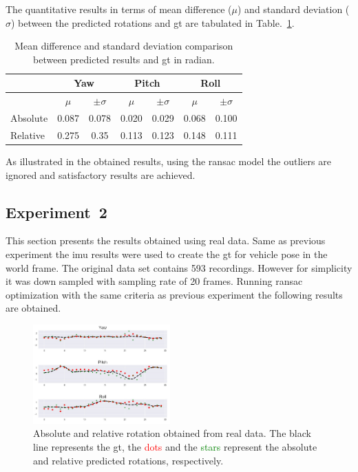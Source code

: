 The quantitative results in terms of mean difference ($\mu$) and standard
deviation ($\sigma$)
between the predicted rotations and \gls{gt} are tabulated in
Table.~\ref{tab:tab1}.

\begin{table}
  \caption{Mean difference and standard deviation comparison between predicted
    results and \gls{gt} in radian.}
  \begin{tabular}{l cc cc cc}
    \toprule
    & \multicolumn{2}{c}{Yaw} & \multicolumn{2}{c}{Pitch} &
                                                            \multicolumn{2}{c}{Roll}\\
    \midrule
    & $\mu$ & $\pm \sigma$ &  $\mu$ & $\pm \sigma$ &  $\mu$ & $\pm \sigma$\\
    \cmidrule{2-3} \cmidrule{4-5} \cmidrule{6-7}

    Absolute & 0.087 & 0.078 & 0.020 & 0.029 & 0.068 & 0.100 \\
    Relative & 0.275 & 0.35 & 0.113 & 0.123 & 0.148 & 0.111\\
    \bottomrule
  \end{tabular}
  \label{tab:tab1}
\end{table}

As illustrated in the obtained results, using the ransac
model the outliers are ignored and satisfactory results are achieved.

\subsection{Experiment~2}
\label{sec:exp2}
This section presents the results obtained using real data. Same as previous
experiment the \gls{imu} results were used to create the \gls{gt} for vehicle
pose in the world frame.
The original data set contains 593 recordings. However for simplicity it was
down sampled with sampling rate of 20 frames.
Running ransac optimization with the same criteria as previous experiment the
following results are obtained.
\begin{figure}
  \includegraphics[width=0.47\textwidth]{./content/experiments/figures/real-ransac-abs-rel-2.jpg}
  \caption{Absolute and relative rotation obtained from real data. The black
    line represents the \gls{gt}, the \textcolor{red}{dots} and the
    \textcolor{green}{stars} represent the absolute and relative predicted
    rotations, respectively.}
  \label{fig:res-syn-ideal-abs-rel}
\end{figure}


